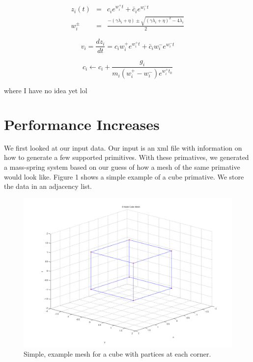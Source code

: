 \documentclass{article}
\begin{document}
  $$
    \begin{array}{ccc}
      z_{i}(t) & = & c_{i} e^{w_{i}^{+}t} + \bar{c}_{i} e^{w_{i}^{-}t} \\ 
      w_{i}^{\pm} & = & \frac{-(\gamma \lambda_{i} + \eta) \pm \sqrt{(\gamma \lambda_{i} + \eta)^2 - 4 \lambda_{i}}}{2}
    \end{array}
  $$

  $$
    v_{i} = \frac{dz_{i}}{dt} = c_{i} w_{i}^{+} e^{w_{i}^{+}t} + \bar{c}_{i} w_{i}^{-} e^{w_{i}^{-}t}  
  $$

  $$
    c_{i} \gets c_{i} + \frac{g_{i}}{m_{i} (w_{i}^{+} - w_{i}^{-}) e^{w_{i}^{+} t_{0}}}
  $$



where I have no idea yet lol

\section{Performance Increases}

We first looked at our input data. Our input is an xml file with information on how to generate a few supported primitives. With these primatives, we generated a mass-spring system based on our guess of how a mesh of the same primative would look like. Figure 1 shows a simple example of a cube primative. We store the data in an adjacency list. 

  \begin{figure}[H]
    \begin{center}
      \includegraphics[width=0.8\columnwidth]{cube_mesh_mesh_plot}
    \end{center} 
    \caption{Simple, example mesh for a cube with partices at each corner.}
  \end{figure}
\end{document}
